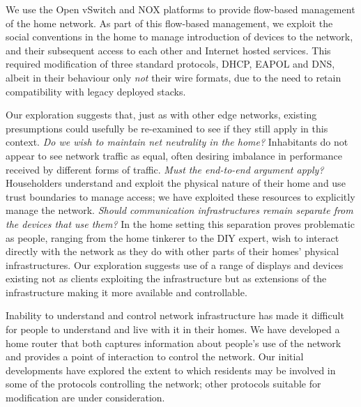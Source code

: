 We use the Open vSwitch and NOX platforms to provide flow-based management of
the home network.  As part of this flow-based management, we exploit the
social conventions in the home to manage introduction of devices  to the
network, and their subsequent access to each other and Internet hosted
services.  This required modification of three standard protocols, DHCP, EAPOL
and DNS, albeit in their behaviour only \emph{not} their wire formats, due to
the need to retain compatibility with legacy deployed stacks.
                                                         
Our exploration suggests that, just as with other edge networks, existing
presumptions could usefully be re-examined to see if they still apply in this
context.  \emph{Do we wish to maintain net neutrality in the home?}
Inhabitants do not appear to see network traffic as equal, often desiring
imbalance in performance received by different forms of traffic.  \emph{Must
the end-to-end argument apply?} Householders understand and exploit the
physical nature of their home and use trust boundaries to manage access; we
have exploited these resources to explicitly manage the network.  \emph{Should
communication infrastructures remain separate from the devices that use them?}
In the home setting this separation proves problematic as people, ranging from
the home tinkerer to the DIY expert, wish to interact directly with the
network as they do with other parts of their homes' physical infrastructures.
Our exploration suggests use of a range of displays and devices existing not
as clients exploiting the infrastructure but as extensions of the
infrastructure making it more available and controllable.

Inability to understand and control network infrastructure has made it
difficult for people to understand and live with it in their homes.  We have
developed a home router that both captures information about people's use of
the network and provides a point of interaction to control the network.  Our
initial developments have explored the extent to which residents may be
involved in some of the protocols controlling the network; other protocols
suitable for modification are under consideration.

